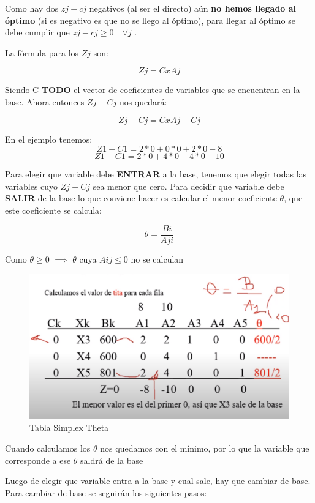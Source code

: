 \documentclass[titlepage,a4paper]{article}
\begin{document}
Como hay dos $zj - cj$ negativos (al ser el directo) aún \textbf{no hemos llegado al óptimo} (si es negativo es que no se llego al óptimo), para llegar al óptimo se debe cumplir que $zj - cj \geq 0 \quad \forall j$ .

La fórmula para los $Zj$ son:

$$Zj = C x Aj$$

Siendo C \textbf{TODO} el vector de coeficientes de variables que se encuentran en la base. Ahora entonces $Zj - Cj$ nos quedará:

$$Zj - Cj = C x Aj - Cj$$

En el ejemplo tenemos:
$$ Z1 - C1 = 2*0 + 0*0 + 2*0 - 8 $$
$$ Z1 - C1 = 2*0 + 4*0 + 4*0 - 10 $$

Para elegir que variable debe \textbf{ENTRAR} a la base, tenemos que elegir todas las variables cuyo $Zj - Cj$ sea menor que cero. Para decidir que variable debe \textbf{SALIR} de la base lo que conviene hacer es calcular el menor coeficiente $\theta$, que este coeficiente se calcula:

$$ \theta = \frac{Bi}{Aji} $$

Como $\theta \geq 0$ $\implies$ $\theta$ cuya $Aij \leq 0$ no se calculan 

\begin{figure}[H]
    \centering
    \includegraphics[scale=0.33]{tabla_simplex_theta.png}
    \caption{Tabla Simplex Theta}
\end{figure}


Cuando calculamos los $\theta$ nos quedamos con el mínimo, por lo que la variable que corresponde a ese $\theta$ saldrá de la base

Luego de elegir que variable entra a la base y cual sale, hay que cambiar de base. Para cambiar de base se seguirán los siguientes pasos:
\end{document}
